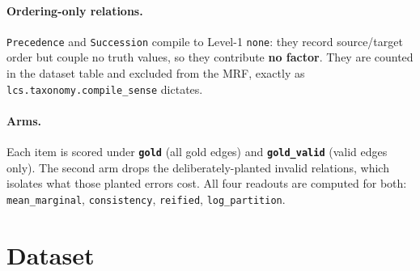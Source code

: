 \documentclass[11pt]{article}
\begin{document}
\paragraph{Ordering-only relations.} \texttt{Precedence} and \texttt{Succession} compile to Level-1 \texttt{none}: they record source/target order but couple no truth values, so they contribute \textbf{no factor}. They are counted in the dataset table and excluded from the MRF, exactly as \texttt{lcs.taxonomy.compile\_sense} dictates.

\paragraph{Arms.} Each item is scored under \textbf{\texttt{gold}} (all gold edges) and \textbf{\texttt{gold\_valid}} (valid edges only). The second arm drops the deliberately-planted invalid relations, which isolates what those planted errors cost. All four readouts are computed for both: \texttt{mean\_marginal}, \texttt{consistency}, \texttt{reified}, \texttt{log\_partition}.

\section{Dataset}
\end{document}
